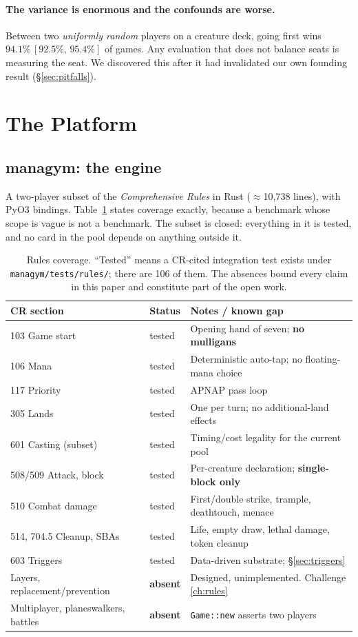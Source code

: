 \documentclass[11pt]{article}
\newcommand{\ci}[2]{\,[#1,\,#2]}
\begin{document}
\paragraph{The variance is enormous and the confounds are worse.} Between two \emph{uniformly random} players on a creature deck, going first wins $94.1\%\ci{92.5\%}{95.4\%}$ of games. Any evaluation that does not balance seats is measuring the seat. We discovered this after it had invalidated our own founding result (\S\ref{sec:pitfalls}).

\section{The Platform}
\label{sec:platform}

\subsection{managym: the engine}

A two-player subset of the \textit{Comprehensive Rules} in Rust ($\approx$10{,}738 lines), with PyO3 bindings. Table~\ref{tab:rules} states coverage exactly, because a benchmark whose scope is vague is not a benchmark. The subset is closed: everything in it is tested, and no card in the pool depends on anything outside it.

\begin{table}[H]
\centering\small
\begin{tabular}{llp{6.4cm}}
\toprule
\textbf{CR section} & \textbf{Status} & \textbf{Notes / known gap} \\
\midrule
103 Game start & tested & Opening hand of seven; \textbf{no mulligans} \\
106 Mana & tested & Deterministic auto-tap; no floating-mana choice \\
117 Priority & tested & APNAP pass loop \\
305 Lands & tested & One per turn; no additional-land effects \\
601 Casting (subset) & tested & Timing/cost legality for the current pool \\
508/509 Attack, block & tested & Per-creature declaration; \textbf{single-block only} \\
510 Combat damage & tested & First/double strike, trample, deathtouch, menace \\
514, 704.5 Cleanup, SBAs & tested & Life, empty draw, lethal damage, token cleanup \\
603 Triggers & tested & Data-driven substrate; \S\ref{sec:triggers} \\
\midrule
Layers, replacement/prevention & \textbf{absent} & Designed, unimplemented. Challenge \ref{ch:rules} \\
Multiplayer, planeswalkers, battles & \textbf{absent} & \texttt{Game::new} asserts two players \\
\bottomrule
\end{tabular}
\caption{Rules coverage. ``Tested'' means a CR-cited integration test exists under \texttt{managym/tests/rules/}; there are 106 of them. The absences bound every claim in this paper and constitute part of the open work.}
\label{tab:rules}
\end{table}
\end{document}
